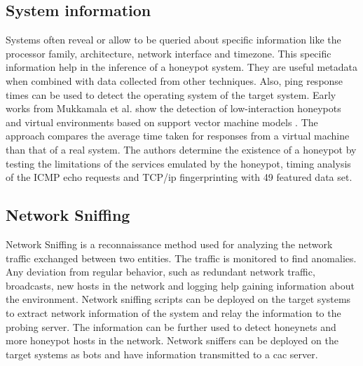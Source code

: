 \subsection{System information}
Systems often reveal or allow to be queried about specific information like the processor family, architecture, network interface and timezone. This specific information help in the inference of a honeypot system. They are useful metadata when combined with data collected from other techniques.  Also, ping response times can be used to detect the operating system of the target system. Early works from Mukkamala et al.  show the detection of low-interaction honeypots and virtual environments based on support vector machine models \cite{mukkamala}. The approach compares the average time taken for responses from a virtual machine than that of a real system. The authors determine the existence of a honeypot by testing the limitations of the services emulated by the honeypot, timing analysis of the ICMP echo requests and TCP/\acrshort{ip} fingerprinting with 49 featured data set.  

\subsection{Network Sniffing}
Network Sniffing is a reconnaissance method used for analyzing the network traffic exchanged between two entities. The traffic is monitored to find anomalies. Any deviation from regular behavior, such as redundant network traffic, broadcasts, new hosts in the network and logging help gaining information about the environment. Network sniffing scripts can be deployed on the target systems to extract network information of the system and relay the information to the probing server. The information can be further used to detect honeynets and more honeypot hosts in the network.  Network sniffers can be deployed on the target systems as bots and have information transmitted to a \acrfull{cac} server. 

